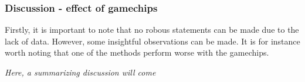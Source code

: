\subsubsection{Discussion - effect of gamechips}
Firstly, it is important to note that no robous statements can be made due to the lack of data. However, some insightful observations can be made. It is for instance worth noting that one of the methods perform worse with the gamechips. 

\textit{Here, a summarizing discussion will come}

